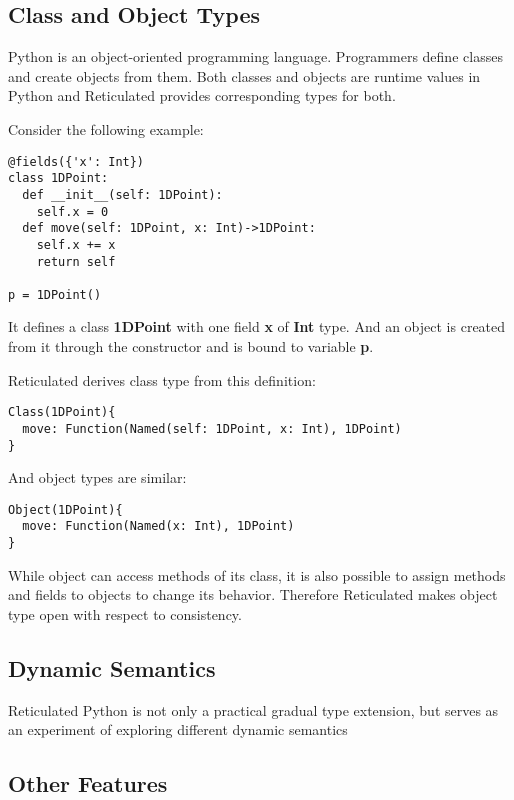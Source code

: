 \subsection{Class and Object Types}

Python is an object-oriented programming language.
Programmers define classes and create objects from them.
Both classes and objects are runtime values in Python
and Reticulated provides corresponding types for both.

Consider the following example:

\begin{verbatim}
@fields({'x': Int})
class 1DPoint:
  def __init__(self: 1DPoint):
    self.x = 0
  def move(self: 1DPoint, x: Int)->1DPoint:
    self.x += x
    return self

p = 1DPoint()
\end{verbatim}

It defines a class \textbf{1DPoint} with one field \textbf{x} of \textbf{Int} type.
And an object is created from it through the constructor
and is bound to variable \textbf{p}.

Reticulated derives class type from this definition:

\begin{verbatim}
Class(1DPoint){
  move: Function(Named(self: 1DPoint, x: Int), 1DPoint)
}
\end{verbatim}

And object types are similar:

\begin{verbatim}
Object(1DPoint){
  move: Function(Named(x: Int), 1DPoint)
}
\end{verbatim}

While object can access methods of its class, it is also possible
to assign methods and fields to objects to change its behavior.
Therefore Reticulated makes object type open with respect to consistency.

\subsection{Dynamic Semantics}

Reticulated Python is not only a practical gradual type extension,
but serves as an experiment of exploring different dynamic semantics

\subsection{Other Features}

